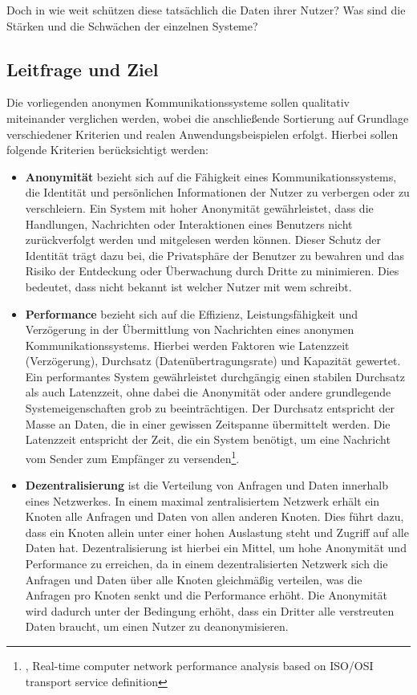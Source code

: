 Doch in wie weit schützen diese tatsächlich die Daten ihrer Nutzer? Was sind die Stärken und die Schwächen der einzelnen Systeme? 

\subsection{Leitfrage und Ziel}

Die vorliegenden anonymen Kommunikationssysteme sollen qualitativ miteinander verglichen werden, wobei die anschließende Sortierung auf Grundlage verschiedener Kriterien und realen Anwendungsbeispielen erfolgt. Hierbei sollen folgende Kriterien berücksichtigt werden:

\begin{itemize}

\item \textbf{Anonymität} bezieht sich auf die Fähigkeit eines Kommunikationssystems, die Identität und persönlichen Informationen der Nutzer zu verbergen oder zu verschleiern. Ein System mit hoher Anonymität gewährleistet, dass die Handlungen, Nachrichten oder Interaktionen eines Benutzers nicht zurückverfolgt werden und mitgelesen werden können. Dieser Schutz der Identität trägt dazu bei, die Privatsphäre der Benutzer zu bewahren und das Risiko der Entdeckung oder Überwachung durch Dritte zu minimieren. Dies bedeutet, dass nicht bekannt ist welcher Nutzer mit wem schreibt.

\item \textbf{Performance} bezieht sich auf die Effizienz, Leistungsfähigkeit und Verzögerung in der Übermittlung von Nachrichten eines anonymen Kommunikationssystems. Hierbei werden Faktoren wie Latenzzeit (Verzögerung), Durchsatz (Datenübertragungsrate) und Kapazität gewertet. Ein performantes System gewährleistet durchgängig einen stabilen Durchsatz als auch Latenzzeit, ohne dabei die Anonymität oder andere grundlegende Systemeigenschaften grob zu beeinträchtigen. Der Durchsatz entspricht der Masse an Daten, die in einer gewissen Zeitspanne übermittelt werden. Die Latenzzeit entspricht der Zeit, die ein System benötigt, um eine Nachricht vom Sender zum Empfänger zu versenden\footnote{\cite{ComputerNetworkPerformanceAnalysis}, Real-time computer network performance analysis based on ISO/OSI transport service definition}.

\item \textbf{Dezentralisierung} ist die Verteilung von Anfragen und Daten innerhalb eines Netzwerkes. In einem maximal zentralisiertem Netzwerk erhält ein Knoten alle Anfragen und Daten von allen anderen Knoten. Dies führt dazu, dass ein Knoten allein unter einer hohen Auslastung steht und Zugriff auf alle Daten hat. Dezentralisierung ist hierbei ein Mittel, um hohe Anonymität und Performance zu erreichen, da in einem dezentralisierten Netzwerk sich die Anfragen und Daten über alle Knoten gleichmäßig verteilen, was die Anfragen pro Knoten senkt und die Performance erhöht. Die Anonymität wird dadurch unter der Bedingung erhöht, dass ein Dritter alle verstreuten Daten braucht, um einen Nutzer zu deanonymisieren.


\end{itemize}
